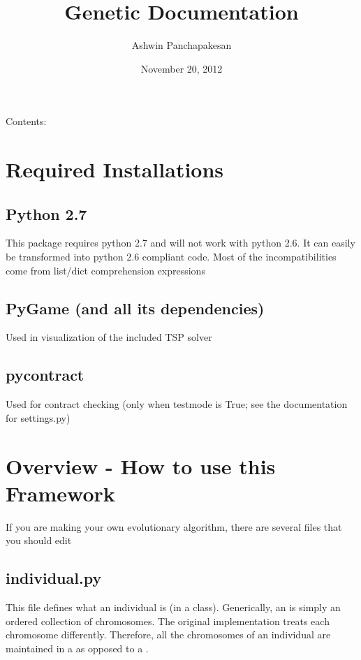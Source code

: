 \documentclass[letterpaper,10pt,english]{sphinxmanual}
\title{Genetic Documentation}
\date{November 20, 2012}
\author{Ashwin Panchapakesan}
\begin{document}
\maketitle
\tableofcontents
{}\label{index::doc}


Contents:


\chapter{Required Installations}
\label{Required Installs:required-installations}\label{Required Installs::doc}\label{Required Installs:welcome-to-genetic-s-documentation}

\section{Python 2.7}
\label{Required Installs:python-2-7}
This package requires python 2.7 and will not work with python 2.6.
It can easily be transformed into python 2.6 compliant code. Most of the incompatibilities come from list/dict comprehension expressions


\section{PyGame (and all its dependencies)}
\label{Required Installs:pygame-and-all-its-dependencies}
Used in visualization of the included TSP solver


\section{pycontract}
\label{Required Installs:pycontract}
Used for contract checking (only when testmode is True; see the documentation for settings.py)


\chapter{Overview - How to use this Framework}
\label{Overview:overview-how-to-use-this-framework}\label{Overview::doc}
If you are making your own evolutionary algorithm, there are several files that you should edit


\section{individual.py}
\label{Overview:individual-py}
This file defines what an individual is (in a class). Generically, an  is simply an ordered collection of chromosomes. The original implementation treats each chromosome differently. Therefore, all the chromosomes of an individual are maintained in a  as opposed to a .
\end{document}
